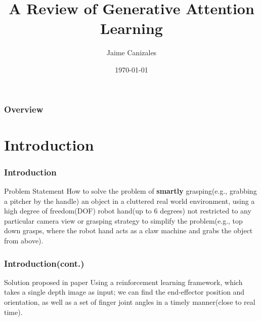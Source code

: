 \documentclass{beamer}
\title[GenerAL]{A Review of Generative Attention Learning} %
\author{Jaime Canizales} %
\institute[Hunter College] %
{
City University of New York \\ %
\medskip
\textit{jaime.canizales@hunter.cuny.edu} %
}
\date{\today} %
\begin{document}
\begin{frame}
\titlepage %
\end{frame}
\begin{frame}
\frametitle{Overview} %
\tableofcontents %
\end{frame}

\section{Introduction}


\begin{frame}\frametitle{Introduction} 
\begin{block}{Problem Statement}
How to solve the problem of \textbf{smartly} grasping(e.g., grabbing a pitcher by the handle) an object in a cluttered real world environment, using a high degree of freedom(DOF) robot hand(up to 6 degrees) not restricted to any particular camera view or grasping strategy to simplify the problem(e.g., top down grasps, where the robot hand acts as a claw machine and grabs the object from above).
\end{block}

\end{frame}


\begin{frame}\frametitle{Introduction(cont.)} 
\begin{block}{Solution proposed in paper}
Using a reinforcement learning framework, which takes a single depth image as input; we can find the end-effector position and orientation, as well as a set of finger joint angles in a timely manner(close to real time).
\end{block}
\end{frame}    
\end{document}
